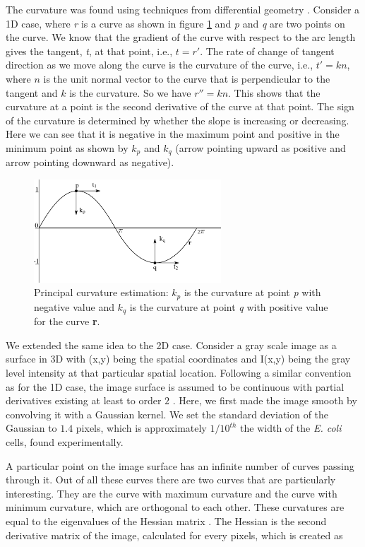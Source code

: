 \documentclass[journal]{IEEEtran}
\begin{document}
The curvature was found using techniques from differential geometry \cite  {willmoreintroduction1959}. Consider a 1D case, where \textit{r} is a curve as shown in figure \ref{fig:curve} and \textit{p} and \textit{q} are two points on the curve. We know that the gradient of the curve with respect to the arc length gives the tangent, \textit{t}, at that point, i.e., $t = r'$. The rate of change of tangent direction as we move along the curve is the curvature of the curve, i.e., $t' = kn$, where $n$ is the unit normal vector to the curve that is perpendicular to the tangent and $k$ is the curvature. So we have $r'' = kn$. This shows that the curvature at a point is the second derivative of the curve at that point.  The sign of the curvature is determined by whether the slope is increasing or decreasing. Here we can see that it is negative in the maximum point and positive in the minimum point as shown by $k_p$ and $k_q$ (arrow pointing upward as positive and arrow pointing downward as negative).
\begin{figure}[t ]
	\begin{center}
		\includegraphics[width=7cm]{fig1cuve.png}
		\caption{Principal curvature estimation: $k_p$ is the curvature at point \textit{p} with negative value and $k_q$ is the curvature at point \textit{q} with positive value for the curve \textbf{r}.}
		\label{fig:curve}
	\end{center}    
\end{figure}
We extended the same idea to the 2D case. Consider a gray scale image as a surface in 3D with (x,y) being the spatial coordinates and I(x,y) being the gray level intensity at that particular spatial location. Following a similar convention as for the 1D case, the image surface is assumed to be continuous with partial derivatives existing at least to order $2$ \cite {willmoreintroduction1959}. Here, we first made the image smooth by convolving it with a Gaussian kernel. We set the standard deviation of the Gaussian to $1.4$ pixels, which is approximately $1/10^{th}$ the width of the \textit{E. coli} cells, found experimentally.


A particular point on the image surface has an infinite number of curves passing through it. Out of all these curves there are two curves that are particularly interesting. They are the curve with maximum curvature and the curve with minimum curvature, which are orthogonal to each other. These curvatures are equal to the eigenvalues of the Hessian matrix \cite {thorpeelementary1979}. The Hessian is the second derivative matrix of the image, calculated for every pixels, which is created as 
\end{document}
